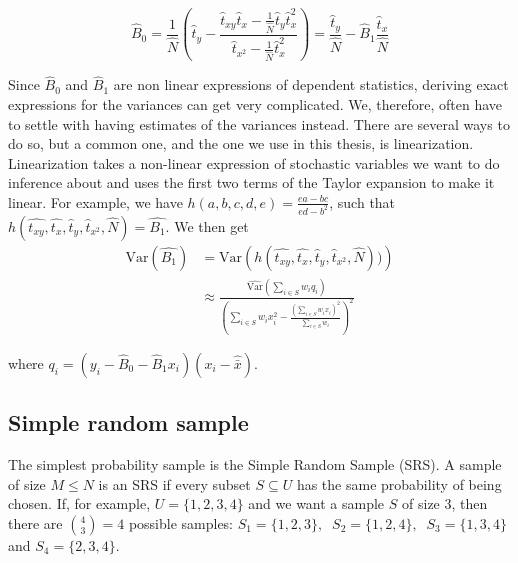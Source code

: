 \documentclass{article}
\begin{document}
\begin{equation*}
 \hat{B}_0 = \frac{1}{\widehat{N}} \left( \hat{t}_y - \frac{\hat{t}_{xy} \hat{t}_x - \frac{1}{\widehat{N}} \hat{t}_y \hat{t}_x^2}
   {\hat{t}_{x^2} - \frac{1}{\widehat{N}} \hat{t}_x^2}
 \right)
 = \frac{\hat{t}_y}{\hat{N}} - \hat{B}_1\frac{\hat{t}_x}{\hat{N}}
\end{equation*}

Since \(\hat{B}_0\) and \(\hat{B}_1\) are non linear expressions of dependent
statistics, deriving exact expressions for the variances can get very complicated. We, therefore,
often have to settle with having estimates of the variances instead.
There are several ways to do so, but a common one,
and the one we use in this thesis, is linearization. Linearization takes a
non-linear expression of stochastic variables we want to do inference about and uses
the first two terms of the Taylor expansion to make it linear.
For example, we have \(h(a, b, c, d, e) = \frac{ea - bc}{ed - b^2}\), such that
\(h(\hat{t_{xy}}, \hat{t_x}, \hat{t}_y, \hat{t}_{x^2}, \hat{N}) = \hat{B_1}\).
We then get
\begin{align*}
 \mathrm{Var}(\hat{B_1})
 &= \mathrm{Var} \left( h(\hat{t_{xy}}, \hat{t_x},
 \hat{t}_y, \hat{t}_{x^2}, \hat{N})) \right) \\
 &\approx \frac{\widehat{\mathrm{Var}}\left( \sum_{i \in S} w_i q_i \right)}
   {\left( \sum_{i \in S} w_i x_i^2 - \frac{\left( \sum_{i \in S} w_i x_i \right)^2}{\sum_{i \in S} w_i} \right)^2}
\end{align*}

where \(q_i = (y_i - \hat{B}_0 - \hat{B}_1 x_i)(x_i - \hat{\bar{x}})\).

\subsection{Simple random sample} \label{sec:SRS}

The simplest probability sample is the Simple Random Sample (SRS). A
sample of size \(M \leq N\) is an SRS if every subset \(S \subseteq U\) has the same
probability of being chosen.
If, for example, \(U = \{1, 2, 3, 4\}\) and we want a sample \(S\) of
size \(3\), then there are \(\binom{4}{3} = 4\)  possible samples:
\( S_1 = \{1, 2, 3\},\ \)
\( S_2 = \{1, 2, 4\},\ \)
\( S_3 = \{1, 3, 4\}\ \) and
\( S_4 = \{2, 3, 4\} \).
\end{document}
